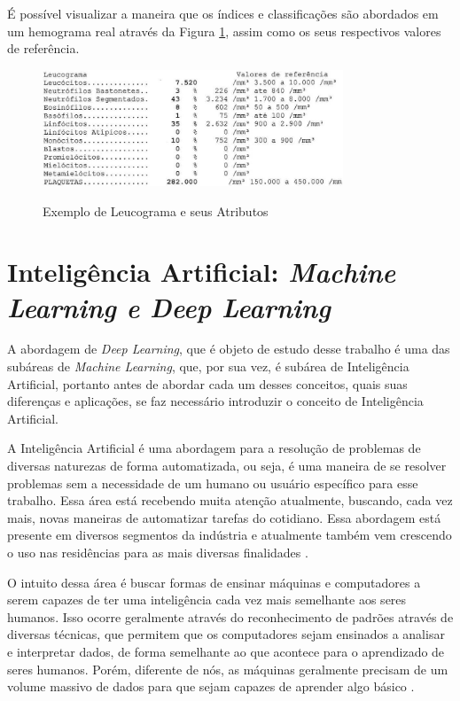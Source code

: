 É possível visualizar a maneira que os índices e classificações são abordados em um hemograma real através da Figura \ref{fig:leucograma}, assim como os seus respectivos valores de referência.

\begin{figure}[!htb]
	\centering
	\caption{Exemplo de Leucograma e seus Atributos}
	\includegraphics[width=0.80\textwidth]{img/leucograma.jpg}
	\label{fig:leucograma}
\end{figure}

\section{Inteligência Artificial: \emph{Machine Learning e Deep Learning}}
\label{sec:conceito2}
A abordagem de \emph{Deep Learning}, que é objeto de estudo desse trabalho é uma das subáreas de \emph{Machine Learning}, que, por sua vez, é subárea de Inteligência Artificial, portanto antes de abordar cada um desses conceitos, quais suas diferenças e aplicações, se faz necessário introduzir o conceito de Inteligência Artificial.

A Inteligência Artificial é uma abordagem para a resolução de problemas de diversas naturezas de forma automatizada, ou seja, é uma maneira de se resolver problemas sem a necessidade de um humano ou usuário específico para esse trabalho. Essa área está recebendo muita atenção atualmente, buscando, cada vez mais, novas maneiras de automatizar tarefas do cotidiano. Essa abordagem está presente em diversos segmentos da indústria e atualmente também vem crescendo o uso nas residências para as mais diversas finalidades \cite{inteligenciaArtificial}.

O intuito dessa área é buscar formas de ensinar máquinas e computadores a serem capazes de ter uma inteligência cada vez mais semelhante aos seres humanos. Isso ocorre geralmente através do reconhecimento de padrões através de diversas técnicas, que permitem que os computadores sejam ensinados a analisar e interpretar dados, de forma semelhante ao que acontece para o aprendizado de seres humanos. Porém, diferente de nós, as máquinas geralmente precisam de um volume massivo de dados para que sejam capazes de aprender algo básico \cite{IAAprendizadoMaquina}.

